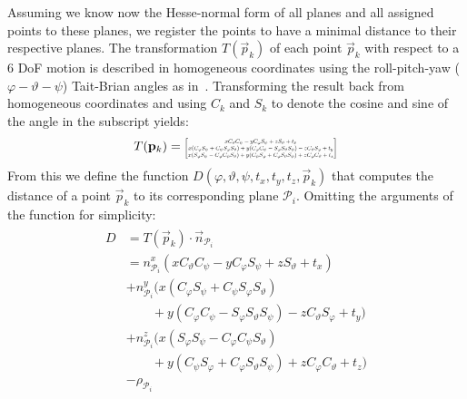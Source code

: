Assuming we know now the Hesse-normal form of all planes and all assigned points to these planes, we register the points to have a minimal distance to their respective planes.
The transformation $T(\vec{p}_k)$ of each point $\vec{p}_k$ with respect to a 6 DoF motion is described in homogeneous coordinates using the roll-pitch-yaw ($\varphi-\vartheta-\psi$) Tait-Brian angles as in~\cite{diebel2006representing}. Transforming the result back from homogeneous coordinates and using $C_k$ and $S_k$ to denote the cosine and sine of the angle in the subscript yields:
\begin{align}
	T(\vec{p}_k)  =
    \resizebox{0.35\textwidth}{!}{$\begin{bmatrix}
        x C_\vartheta C_\psi - yC_\varphi S_\psi + z S_\vartheta + t_x\\
        x (C_\varphi S_\psi + C_\psi S_\varphi S_\vartheta) + y(C_\varphi C_\psi - S_\varphi S_\vartheta S_\psi) - z C_\vartheta S_\varphi + t_y\\
        x(S_\varphi S_\psi - C_\varphi C_\psi S_\vartheta) + y(C_\psi S_\varphi + C_\varphi S_\vartheta S_\psi) + z C_\varphi C_\vartheta + t_z
    \end{bmatrix}$}
\end{align}
From this we define the function $D(\varphi,\vartheta,\psi,t_x,t_y,t_z, \vec{p}_k)$ that computes the distance of a point $\vec{p}_k$ to its corresponding plane $\mathcal{P}_i$.
 Omitting the arguments of the function for simplicity:
\begin{align}
\begin{aligned}
    D &= T(\vec{p}_k) \cdot \vec{n}_{\mathcal{P}_i} \\
      &= n_{\mathcal{P}_i}^x (x C_\vartheta C_\psi - yC_\varphi S_\psi + z S_\vartheta + t_x)\\
       &+ n_{\mathcal{P}_i}^y(x (C_\varphi S_\psi + C_\psi S_\varphi S_\vartheta)\\
       &\qquad+ y(C_\varphi C_\psi - S_\varphi S_\vartheta S_\psi) - z C_\vartheta S_\varphi + t_y)\\
       &+ n_{\mathcal{P}_i}^z (x(S_\varphi S_\psi - C_\varphi C_\psi S_\vartheta)\\
       &\qquad+ y(C_\psi S_\varphi + C_\varphi S_\vartheta S_\psi) + z C_\varphi C_\vartheta + t_z)\\
       &- \rho_{\mathcal{P}_i}
\end{aligned}
\end{align}

